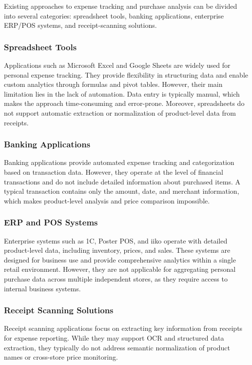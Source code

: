Existing approaches to expense tracking and purchase analysis can be divided into several categories: spreadsheet tools, banking applications, enterprise ERP/POS systems, and receipt-scanning solutions.

\subsubsection{Spreadsheet Tools}

Applications such as Microsoft Excel and Google Sheets are widely used for personal expense tracking. They provide flexibility in structuring data and enable custom analytics through formulas and pivot tables. However, their main limitation lies in the lack of automation. Data entry is typically manual, which makes the approach time-consuming and error-prone. Moreover, spreadsheets do not support automatic extraction or normalization of product-level data from receipts.

\subsubsection{Banking Applications}

Banking applications provide automated expense tracking and categorization based on transaction data. However, they operate at the level of financial transactions and do not include detailed information about purchased items. A typical transaction contains only the amount, date, and merchant information, which makes product-level analysis and price comparison impossible.

\subsubsection{ERP and POS Systems}

Enterprise systems such as 1C, Poster POS, and iiko operate with detailed product-level data, including inventory, prices, and sales. These systems are designed for business use and provide comprehensive analytics within a single retail environment. However, they are not applicable for aggregating personal purchase data across multiple independent stores, as they require access to internal business systems.

\subsubsection{Receipt Scanning Solutions}

Receipt scanning applications focus on extracting key information from receipts for expense reporting. While they may support OCR and structured data extraction, they typically do not address semantic normalization of product names or cross-store price monitoring.

